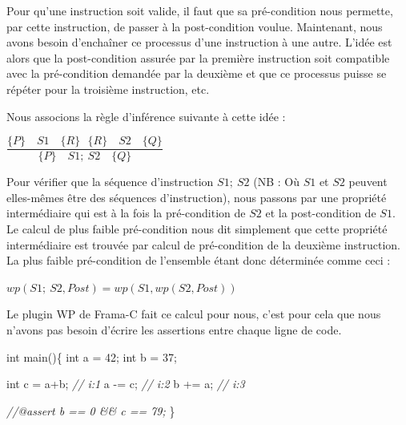 \documentclass[12pt,francais,]{scrbook}
\newenvironment{Shaded}{}{}
\newcommand{\DataTypeTok}[1]{\textcolor[rgb]{0.56,0.13,0.00}{{#1}}}
\newcommand{\DecValTok}[1]{\textcolor[rgb]{0.25,0.63,0.44}{{#1}}}
\newcommand{\CommentTok}[1]{\textcolor[rgb]{0.38,0.63,0.69}{\textit{{#1}}}}
\newcommand{\NormalTok}[1]{{#1}}
\begin{document}
Pour qu'une instruction soit valide, il faut que sa pré-condition nous
permette, par cette instruction, de passer à la post-condition voulue.
Maintenant, nous avons besoin d'enchaîner ce processus d'une instruction
à une autre. L'idée est alors que la post-condition assurée par la
première instruction soit compatible avec la pré-condition demandée par
la deuxième et que ce processus puisse se répéter pour la troisième
instruction, etc.

Nous associons la règle d'inférence suivante à cette idée :

\begin{center}
\(\dfrac{\{P\}\quad S1 \quad \{R\} \ \ \ \{R\}\quad S2 \quad \{Q\}}{\{P\}\quad S1 ;\ S2 \quad \{Q\}}\)
\end{center}

Pour vérifier que la séquence d'instruction \(S1;\ S2\) (NB : Où \(S1\)
et \(S2\) peuvent elles-mêmes être des séquences d'instruction), nous
passons par une propriété intermédiaire qui est à la fois la
pré-condition de \(S2\) et la post-condition de \(S1\). Le calcul de
plus faible pré-condition nous dit simplement que cette propriété
intermédiaire est trouvée par calcul de pré-condition de la deuxième
instruction. La plus faible pré-condition de l'ensemble étant donc
déterminée comme ceci :

\begin{center} \(wp(S1;\ S2 , Post) = wp(S1, wp(S2, Post) )\)
\end{center}

Le plugin WP de Frama-C fait ce calcul pour nous, c'est pour cela que
nous n'avons pas besoin d'écrire les assertions entre chaque ligne de
code.

\begin{footnotesize}\begin{Shaded}
\begin{Highlighting}[]
\DataTypeTok{int} \NormalTok{main()\{}
  \DataTypeTok{int} \NormalTok{a = }\DecValTok{42}\NormalTok{;}
  \DataTypeTok{int} \NormalTok{b = }\DecValTok{37}\NormalTok{;}

  \DataTypeTok{int} \NormalTok{c = a+b; }\CommentTok{// i:1}
  \NormalTok{a -= c;      }\CommentTok{// i:2}
  \NormalTok{b += a;      }\CommentTok{// i:3}

  \CommentTok{//@assert b == 0 && c == 79;}
\NormalTok{\}}
\end{Highlighting}
\end{Shaded}\end{footnotesize}
\end{document}
